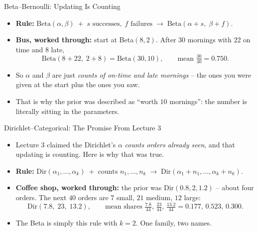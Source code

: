 \begin{frame}{Beta--Bernoulli: Updating Is Counting}
\begin{itemize}
  \item \textbf{Rule:} \; $\text{Beta}(\alpha, \beta) \;+\; s \text{ successes},\; f \text{ failures} \;\longrightarrow\; \text{Beta}(\alpha + s,\; \beta + f)$.
  \pause
  \item \textbf{Bus, worked through:} start at Beta$(8,2)$. After $30$ mornings with $22$ on time and $8$ late,
  \[
    \text{Beta}(8 + 22,\; 2 + 8) = \text{Beta}(30, 10), \qquad \text{mean } \tfrac{30}{40} = 0.750 .
  \]
  \pause
  \item So $\alpha$ and $\beta$ are just \emph{counts of on-time and late mornings} -- the ones you were given at the start plus the ones you saw.
  \pause
  \item That is why the prior was described as ``worth $10$ mornings'': the number is literally sitting in the parameters.
\end{itemize}
\end{frame}

\begin{frame}{Dirichlet--Categorical: The Promise From Lecture 3}
\begin{itemize}
  \item Lecture 3 claimed the Dirichlet's $\alpha$ \emph{counts orders already seen}, and that updating is counting. Here is why that was true.
  \pause
  \item \textbf{Rule:} \; $\text{Dir}(\alpha_1, \dots, \alpha_k) \;+\; \text{counts } n_1, \dots, n_k \;\longrightarrow\; \text{Dir}(\alpha_1 + n_1, \dots, \alpha_k + n_k)$.
  \pause
  \item \textbf{Coffee shop, worked through:} the prior was $\text{Dir}(0.8, 2, 1.2)$ -- about four orders. The next $40$ orders are $7$ small, $21$ medium, $12$ large:
  \[
    \text{Dir}(7.8,\; 23,\; 13.2), \qquad \text{mean shares } \tfrac{7.8}{44},\, \tfrac{23}{44},\, \tfrac{13.2}{44} = 0.177,\, 0.523,\, 0.300 .
  \]
  \pause
  \item The Beta is simply this rule with $k = 2$. One family, two names.
\end{itemize}
\end{frame}

